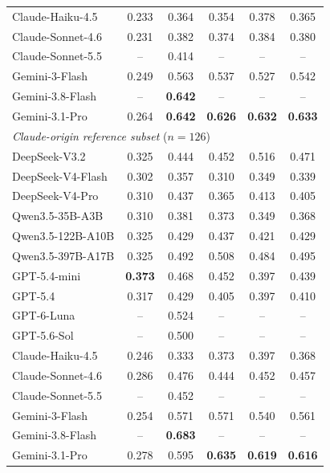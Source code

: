 \documentclass[11pt]{article}
\begin{document}
\begin{table}[!t]
\begin{tabular}{lc|ccc|c}
\quad Claude-Haiku-4.5           & 0.233 & 0.364 & 0.354 & 0.378 & 0.365 \\
\quad Claude-Sonnet-4.6          & 0.231 & 0.382 & 0.374 & 0.384 & 0.380 \\
\quad Claude-Sonnet-5.5           & -- & 0.414 & -- & -- & -- \\
\quad Gemini-3-Flash             & 0.249 & 0.563 & 0.537 & 0.527 & 0.542 \\
\quad Gemini-3.8-Flash            & -- & \textbf{0.642} & -- & -- & -- \\
\quad Gemini-3.1-Pro             & 0.264 & \textbf{0.642} & \textbf{0.626} & \textbf{0.632} & \textbf{0.633} \\
\midrule
\multicolumn{6}{l}{\textit{Claude-origin reference subset} ($n=126$)} \\
\midrule
\quad DeepSeek-V3.2              & 0.325 & 0.444 & 0.452 & 0.516 & 0.471 \\
\quad DeepSeek-V4-Flash          & 0.302 & 0.357 & 0.310 & 0.349 & 0.339 \\
\quad DeepSeek-V4-Pro            & 0.310 & 0.437 & 0.365 & 0.413 & 0.405 \\
\quad Qwen3.5-35B-A3B            & 0.310 & 0.381 & 0.373 & 0.349 & 0.368 \\
\quad Qwen3.5-122B-A10B          & 0.325 & 0.429 & 0.437 & 0.421 & 0.429 \\
\quad Qwen3.5-397B-A17B          & 0.325 & 0.492 & 0.508 & 0.484 & 0.495 \\
\quad GPT-5.4-mini               & \textbf{0.373} & 0.468 & 0.452 & 0.397 & 0.439 \\
\quad GPT-5.4                    & 0.317 & 0.429 & 0.405 & 0.397 & 0.410 \\
\quad GPT-6-Luna                  & -- & 0.524 & -- & -- & -- \\
\quad GPT-5.6-Sol                 & -- & 0.500 & -- & -- & -- \\
\quad Claude-Haiku-4.5           & 0.246 & 0.333 & 0.373 & 0.397 & 0.368 \\
\quad Claude-Sonnet-4.6          & 0.286 & 0.476 & 0.444 & 0.452 & 0.457 \\
\quad Claude-Sonnet-5.5           & -- & 0.452 & -- & -- & -- \\
\quad Gemini-3-Flash             & 0.254 & 0.571 & 0.571 & 0.540 & 0.561 \\
\quad Gemini-3.8-Flash            & -- & \textbf{0.683} & -- & -- & -- \\
\quad Gemini-3.1-Pro             & 0.278 & 0.595 & \textbf{0.635} & \textbf{0.619} & \textbf{0.616} \\

\end{tabular}
\end{table}
\end{document}
